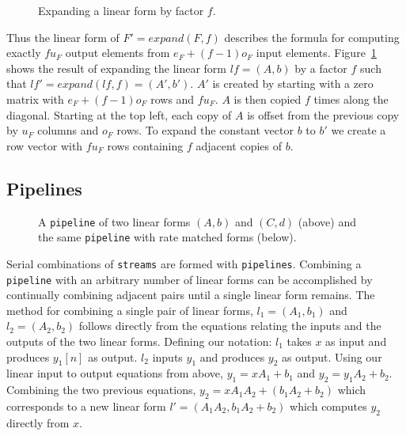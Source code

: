 \begin{figure}
\center
\epsfxsize=3.0in
\caption{Expanding a linear form by factor $f$.}
\label{fig:expanding-a-matrix}
\vspace{-12pt}
\end{figure}

Thus the linear form of $F'=expand(F, f)$ describes the formula for computing
exactly $fu_F$ output elements from $e_F + (f-1)o_F$ input elements.
Figure~\ref{fig:expanding-a-matrix} shows the result of expanding the linear 
form $lf = (A,b)$ by a factor $f$ such that $lf' = expand(lf, f) = (A',b')$. 
$A'$ is created by starting with a zero matrix with $e_F+(f-1)o_F$ rows 
and $fu_F$. $A$ is then copied $f$ times along the
diagonal. Starting at the top left, each copy of $A$ is offset from the previous copy 
by $u_F$ columns and $o_F$ rows. To expand the constant vector $b$ to $b'$ we 
create a row vector with $fu_F$ rows containing $f$ adjacent copies of $b$.

\subsection{Pipelines}

\begin{figure}
\center
\epsfxsize=3.0in
\caption{A {\tt pipeline} of two linear forms $(A,b)$ and $(C,d)$ (above) and the same {\tt pipeline} with rate matched forms (below).}
\label{fig:combining-pipeline}
\vspace{-12pt}
\end{figure}

Serial combinations of {\tt streams} are formed with {\tt pipelines}.
Combining a {\tt pipeline} with an arbitrary number of linear forms can be accomplished 
by continually combining adjacent pairs until a single linear form remains. 
The method for combining a single pair of linear forms, $l_1=(A_1,b_1)$ and $l_2=(A_2,b_2)$ follows
directly from the equations relating the inputs and the outputs of the 
two linear forms. Defining our notation: $l_1$ takes $x$ as input and produces 
$y_1[n]$ as output. $l_2$ inputs $y_1$ and produces $y_2$ as output. 
Using our linear input to output equations from above, $y_1 = xA_1 + b_1$ 
and $y_2 = y_1A_2 + b_2$. Combining the two previous equations, $y_2 = xA_1A_2 + (b_1A_2 + b_2)$ 
which corresponds to a new linear form $l'=(A_1A_2, b_1A_2+b_2)$ which computes
$y_2$ directly from $x$.

